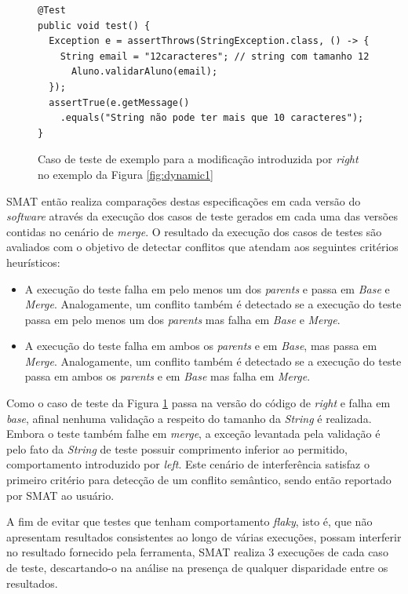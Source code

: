 \documentclass[12pt]{article}
\begin{document}
\begin{figure}[H]
\begin{verbatim}
@Test
public void test() {
  Exception e = assertThrows(StringException.class, () -> {
    String email = "12caracteres"; // string com tamanho 12
      Aluno.validarAluno(email);
  });
  assertTrue(e.getMessage()
    .equals("String não pode ter mais que 10 caracteres");
}
\end{verbatim}
\caption{Caso de teste de exemplo para a modificação introduzida por \textit{right} no exemplo da Figura \ref{fig:dynamic1}}
\label{fig:teste}
\end{figure}
SMAT então realiza comparações destas especificações em cada versão do  \textit{software} através da execução dos casos de teste gerados em cada uma das versões contidas no cenário de \textit{merge}. O resultado da execução dos casos de testes são avaliados com o objetivo de detectar conflitos que atendam aos seguintes critérios heurísticos:
\begin{itemize}
    \item A execução do teste falha em pelo menos um dos \textit{parents} e passa em \textit{Base} e \textit{Merge}. Analogamente, um conflito também é detectado se a execução do teste passa em pelo menos um dos \textit{parents} mas falha em \textit{Base} e \textit{Merge}.
    \item A execução do teste falha em ambos os \textit{parents} e em \textit{Base}, mas passa em \textit{Merge}. Analogamente, um conflito também é detectado se a execução do teste passa em ambos os \textit{parents} e em \textit{Base} mas falha em \textit{Merge}.
\end{itemize}
Como o caso de teste da Figura \ref{fig:teste} passa na versão do código de \textit{right} e falha em \textit{base}, afinal nenhuma validação a respeito do tamanho da \textit{String} é realizada. Embora o teste também falhe em \textit{merge}, a exceção levantada pela validação é pelo fato da \textit{String} de teste possuir comprimento inferior ao permitido, comportamento introduzido por \textit{left}. Este cenário de interferência satisfaz o primeiro critério para detecção de um conflito semântico, sendo então reportado por SMAT ao usuário.

A fim de evitar que testes que tenham comportamento \textit{flaky}, isto é, que não apresentam resultados consistentes ao longo de várias execuções, possam interferir no resultado fornecido pela ferramenta, SMAT realiza 3 execuções de cada caso de teste, descartando-o na análise na presença de qualquer disparidade entre os resultados.
\end{document}
